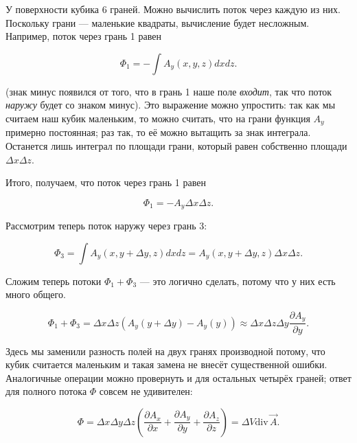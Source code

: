 \documentclass[a4paper,12pt]{article}
\numberwithin{equation}{section}
\newcommand{\pt}{\partial}
\renewcommand{\div}{\mathrm{div}\,}
\begin{document}
У поверхности кубика 6 граней. Можно вычислить поток через каждую из
них. Поскольку грани --- маленькие квадраты, вычисление будет
несложным. Например, поток через грань 1 равен

\begin{equation}
  \label{eq:theorem_divergence_1}
  \Phi_1 = -\int A_y (x,y,z) dx dz.
\end{equation}

(знак минус появился от того, что в грань 1 наше поле \emph{входит},
так что поток \emph{наружу} будет со знаком минус). Это выражение
можно упростить: так как мы считаем наш кубик маленьким, то можно
считать, что на грани функция $A_y$ примерно постоянная; раз так, то
её можно вытащить за знак интеграла. Останется лишь интеграл по
площади грани, который равен собственно площади $\Delta x \Delta z$. 

Итого, получаем, что поток через грань 1 равен

\begin{equation}
  \Phi_1 = - A_y \Delta x \Delta z. 
\end{equation}

Рассмотрим теперь поток наружу через грань 3:

\begin{equation}
  \Phi_3 = \int A_y (x,y + \Delta y,z) dx dz = A_y (x,y+\Delta y,z)
  \Delta x \Delta z.
\end{equation}

Сложим теперь потоки $\Phi_1 + \Phi_3$ --- это логично сделать, потому
что у них есть много общего. 

\begin{equation}
  \label{eq:theorem_divergence_2}
  \Phi_1 + \Phi_3 = \Delta x \Delta z \left(A_y(y+\Delta y) - A_y
    (y)\right) \approx \Delta x \Delta z \Delta y \frac{\pt A_y}{\pt y}.
\end{equation}

Здесь мы заменили разность полей на двух гранях производной потому,
что кубик считается маленьким и такая замена не внесёт существенной
ошибки. Аналогичные операции можно провернуть и для остальных четырёх
граней; ответ для полного потока $\Phi$ совсем не удивителен:

\begin{equation}
  \label{eq:theorem_divergence_3}
  \Phi = \Delta x \Delta y \Delta z
  \left(
    \frac{\pt A_x}{\pt x} + 
    \frac{\pt A_y}{\pt y} + 
    \frac{\pt A_z}{\pt z}
  \right) = \Delta V \div \vec{A}. 
\end{equation}
\end{document}
